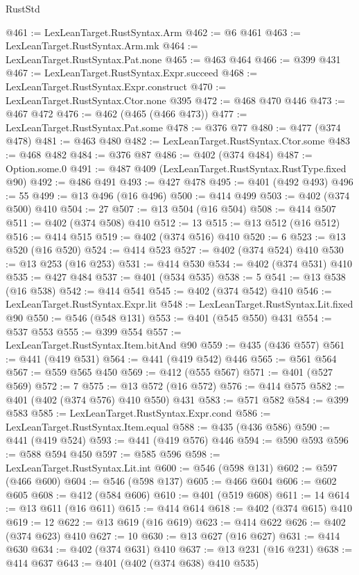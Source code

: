 \begin{lexlean}{RustStd}
\begin{coremodule}
{\begin{coremodule}
{{{{{@461 := LexLeanTarget.RustSyntax.Arm
@462 := @6 @461
@463 := LexLeanTarget.RustSyntax.Arm.mk
@464 := LexLeanTarget.RustSyntax.Pat.none
@465 := @463 @464
@466 := @399 @431
@467 := LexLeanTarget.RustSyntax.Expr.succeed
@468 := LexLeanTarget.RustSyntax.Expr.construct
@470 := LexLeanTarget.RustSyntax.Ctor.none @395
@472 := @468 @470 @446
@473 := @467 @472
@476 := @462 (@465 (@466 @473))
@477 := LexLeanTarget.RustSyntax.Pat.some
@478 := @376 @77
@480 := @477 (@374 @478)
@481 := @463 @480
@482 := LexLeanTarget.RustSyntax.Ctor.some
@483 := @468 @482
@484 := @376 @87
@486 := @402 (@374 @484)
@487 := Option.some.{0}
@491 := @487 @409 (LexLeanTarget.RustSyntax.RustType.fixed @90)
@492 := @486 @491
@493 := @427 @478
@495 := @401 (@492 @493)
@496 := 55
@499 := @13 @496 (@16 @496)
@500 := @414 @499
@503 := @402 (@374 @500) @410
@504 := 27
@507 := @13 @504 (@16 @504)
@508 := @414 @507
@511 := @402 (@374 @508) @410
@512 := 13
@515 := @13 @512 (@16 @512)
@516 := @414 @515
@519 := @402 (@374 @516) @410
@520 := 6
@523 := @13 @520 (@16 @520)
@524 := @414 @523
@527 := @402 (@374 @524) @410
@530 := @13 @253 (@16 @253)
@531 := @414 @530
@534 := @402 (@374 @531) @410
@535 := @427 @484
@537 := @401 (@534 @535)
@538 := 5
@541 := @13 @538 (@16 @538)
@542 := @414 @541
@545 := @402 (@374 @542) @410
@546 := LexLeanTarget.RustSyntax.Expr.lit
@548 := LexLeanTarget.RustSyntax.Lit.fixed @90
@550 := @546 (@548 @131)
@553 := @401 (@545 @550) @431
@554 := @537 @553
@555 := @399 @554
@557 := LexLeanTarget.RustSyntax.Item.bitAnd @90
@559 := @435 (@436 @557)
@561 := @441 (@419 @531)
@564 := @441 (@419 @542) @446
@565 := @561 @564
@567 := @559 @565 @450
@569 := @412 (@555 @567)
@571 := @401 (@527 @569)
@572 := 7
@575 := @13 @572 (@16 @572)
@576 := @414 @575
@582 := @401 (@402 (@374 @576) @410 @550) @431
@583 := @571 @582
@584 := @399 @583
@585 := LexLeanTarget.RustSyntax.Expr.cond
@586 := LexLeanTarget.RustSyntax.Item.equal
@588 := @435 (@436 @586)
@590 := @441 (@419 @524)
@593 := @441 (@419 @576) @446
@594 := @590 @593
@596 := @588 @594 @450
@597 := @585 @596
@598 := LexLeanTarget.RustSyntax.Lit.int
@600 := @546 (@598 @131)
@602 := @597 (@466 @600)
@604 := @546 (@598 @137)
@605 := @466 @604
@606 := @602 @605
@608 := @412 (@584 @606)
@610 := @401 (@519 @608)
@611 := 14
@614 := @13 @611 (@16 @611)
@615 := @414 @614
@618 := @402 (@374 @615) @410
@619 := 12
@622 := @13 @619 (@16 @619)
@623 := @414 @622
@626 := @402 (@374 @623) @410
@627 := 10
@630 := @13 @627 (@16 @627)
@631 := @414 @630
@634 := @402 (@374 @631) @410
@637 := @13 @231 (@16 @231)
@638 := @414 @637
@643 := @401 (@402 (@374 @638) @410 @535)
}}}}}
\end{coremodule}}
\end{coremodule}
\end{lexlean}
